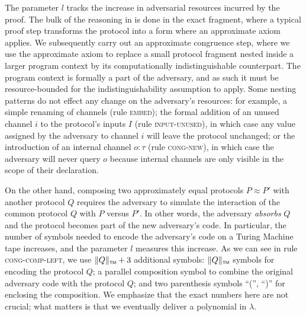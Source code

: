 The parameter $l$ tracks the increase in adversarial resources incurred by the proof. The bulk of the reasoning in \ipdl is done in the exact fragment, where a typical proof step transforms the protocol into a form where an approximate axiom applies. We subsequently carry out an approximate congruence step, where we use the approximate axiom to replace a small protocol fragment nested inside a larger program context by its computationally indistinguishable counterpart. The program context is formally a part of the adversary, and as such it must be resource-bounded for the indistinguishability assumption to apply. Some nesting patterns do not effect any change on the adversary's resources: for example, a simple renaming of channels (rule \textsc{embed}); the formal addition of an unused channel $i$ to the protocol's inputs $I$ (rule \textsc{input-unused}), in which case any value assigned by the adversary to channel $i$ will leave the protocol unchanged; or the introduction of an internal channel $o : \tau$ (rule \textsc{cong-new}), in which case the adversary will never query $o$ because internal channels are only visible in the scope of their declaration.

On the other hand, composing two approximately equal protocols $P \approx P'$ with another protocol $Q$ requires the adversary to simulate the interaction of the common protocol $Q$ with $P$ versus $P'$. In other words, the adversary \emph{absorbs} $Q$ and the protocol becomes part of the new adversary's code. In particular, the number of symbols needed to encode the adversary's code on a Turing Machine tape increases, and the parameter $l$ measures this increase. As we can see in rule \textsc{cong-comp-left}, we use $\Vert Q \Vert_{\scriptscriptstyle \mathsf{TM}} + 3$ additional symbols: $\Vert Q \Vert_{\scriptscriptstyle \mathsf{TM}}$ symbols for encoding the protocol $Q$; a parallel composition symbol to combine the original adversary code with the protocol $Q$; and two parenthesis symbols \textsf{``(''}, \textsf{``)''} for enclosing the composition. We emphasize that the exact numbers here are not crucial; what matters is that we eventually deliver a polynomial in $\lambda$. \smallskip

